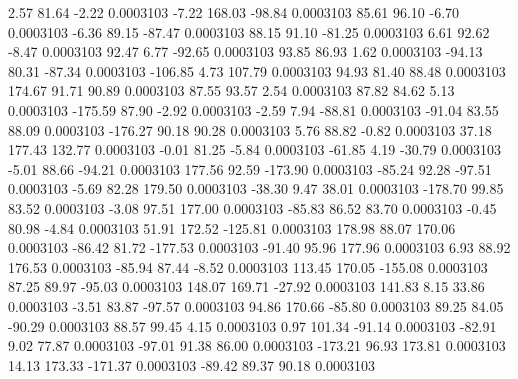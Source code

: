         2.57       81.64       -2.22     0.0003103
       -7.22      168.03      -98.84     0.0003103
       85.61       96.10       -6.70     0.0003103
       -6.36       89.15      -87.47     0.0003103
       88.15       91.10      -81.25     0.0003103
        6.61       92.62       -8.47     0.0003103
       92.47        6.77      -92.65     0.0003103
       93.85       86.93        1.62     0.0003103
      -94.13       80.31      -87.34     0.0003103
     -106.85        4.73      107.79     0.0003103
       94.93       81.40       88.48     0.0003103
      174.67       91.71       90.89     0.0003103
       87.55       93.57        2.54     0.0003103
       87.82       84.62        5.13     0.0003103
     -175.59       87.90       -2.92     0.0003103
       -2.59        7.94      -88.81     0.0003103
      -91.04       83.55       88.09     0.0003103
     -176.27       90.18       90.28     0.0003103
        5.76       88.82       -0.82     0.0003103
       37.18      177.43      132.77     0.0003103
       -0.01       81.25       -5.84     0.0003103
      -61.85        4.19      -30.79     0.0003103
       -5.01       88.66      -94.21     0.0003103
      177.56       92.59     -173.90     0.0003103
      -85.24       92.28      -97.51     0.0003103
       -5.69       82.28      179.50     0.0003103
      -38.30        9.47       38.01     0.0003103
     -178.70       99.85       83.52     0.0003103
       -3.08       97.51      177.00     0.0003103
      -85.83       86.52       83.70     0.0003103
       -0.45       80.98       -4.84     0.0003103
       51.91      172.52     -125.81     0.0003103
      178.98       88.07      170.06     0.0003103
      -86.42       81.72     -177.53     0.0003103
      -91.40       95.96      177.96     0.0003103
        6.93       88.92      176.53     0.0003103
      -85.94       87.44       -8.52     0.0003103
      113.45      170.05     -155.08     0.0003103
       87.25       89.97      -95.03     0.0003103
      148.07      169.71      -27.92     0.0003103
      141.83        8.15       33.86     0.0003103
       -3.51       83.87      -97.57     0.0003103
       94.86      170.66      -85.80     0.0003103
       89.25       84.05      -90.29     0.0003103
       88.57       99.45        4.15     0.0003103
        0.97      101.34      -91.14     0.0003103
      -82.91        9.02       77.87     0.0003103
      -97.01       91.38       86.00     0.0003103
     -173.21       96.93      173.81     0.0003103
       14.13      173.33     -171.37     0.0003103
      -89.42       89.37       90.18     0.0003103
